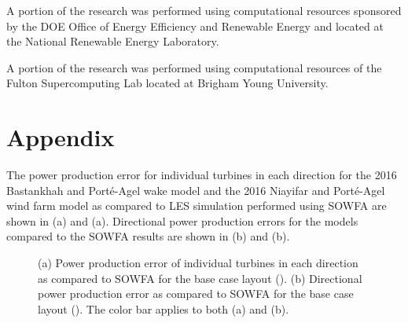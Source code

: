 \documentclass[conf]{new-aiaa}
\begin{document}
A portion of the research was performed using computational resources sponsored by the DOE Office of Energy Efficiency and Renewable Energy and located at the National Renewable Energy Laboratory. 

A portion of the research was performed using computational resources of the Fulton Supercomputing Lab located at Brigham Young University.

\section*{Appendix}
The power production error for individual turbines in each direction for the 2016 Bastankhah and Port\'{e}-Agel wake model and the 2016 Niayifar and Port\'{e}-Agel wind farm model as compared to LES simulation performed using SOWFA are shown in (a) and (a). Directional power production errors for the models compared to the SOWFA results are shown in (b) and (b).
%
\begin{figure}[htpb!]
	\centering
	\caption{(a) Power production error of individual turbines in each direction as compared to SOWFA for the base case layout (). (b) Directional power production error as compared to SOWFA for the base case layout ().  The color bar applies to both (a) and (b).}
	\label{fig:basecase-power-error}
\end{figure}
\end{document}
